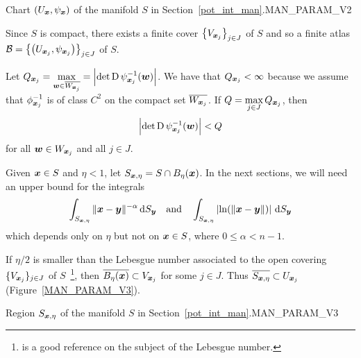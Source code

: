 {Chart $\displaystyle (U_{{\bm{x}}},\psi_{{\bm{x}}})$ of the manifold $S$ in
Section~\ref{pot_int_man}.}{MAN_PARAM_V2}

Since $S$ is compact, there exists a finite cover
$\displaystyle \left\{ V_{{\bm{x}}_j} \right\}_{j\in J}$ of $S$
and so a finite atlas
$\displaystyle \mathcal{B}
= \left\{ \left(U_{{\bm{x}}_j}, \psi_{{\bm{x}}_j}\right) \right\}_{j\in J}$
of $S$.

Let $\displaystyle Q_{{\bm{x}}_j} = \max_{{\bm{w}} \in \overline{W_{{\bm{x}}_j}}}
= \left|\det \operatorname{D} \psi_{{\bm{x}}_j}^{-1}({\bm{w}})\right|$.  We have that
$\displaystyle Q_{{\bm{x}}_j} < \infty$ because we assume that
$\displaystyle \phi_{{\bm{x}}_j}^{-1}$ is of class $\displaystyle C^2$
on the compact set $\displaystyle \overline{W_{{\bm{x}}_j}}$.
If $\displaystyle Q = \max_{j \in J} Q_{{\bm{x}}_j}$, then
\begin{equation} \label{defnQdetpsim1}
\left|\det \operatorname{D} \psi_{{\bm{x}}_j}^{-1}({\bm{w}})\right| < Q
\end{equation}
for all $\displaystyle {\bm{w}} \in W_{{\bm{x}}_j}$ and all $j \in J$.

Given ${\bm{x}} \in S$ and $\eta < 1$,
let $\displaystyle S_{{\bm{x}},\eta} = S \cap B_{\eta}({\bm{x}})$.
In the next sections, we will need an upper bound for the integrals
\[
\int_{S_{{\bm{x}},\eta}} \|{\bm{x}}-{\bm{y}}\|^{-\alpha} \,\mathrm{d}{S}_{{\bm{y}}} 
\quad \text{and} \quad
\int_{S_{{\bm{x}},\eta}} \left| \ln(\|{\bm{x}}-{\bm{y}}\|) \right| \,\mathrm{d}{S}_{{\bm{y}}} 
\]
which depends only on $\eta$ but not on ${\bm{x}} \in S$, where
$0 \leq \alpha < n - 1$.

If $\eta/2$ is smaller than the Lebesgue number associated to the
open covering $\displaystyle \{ V_{{\bm{x}}_j}\}_{j\in J}$ of
$S$~\footnote{\cite{Mu} is a good reference on the subject of the Lebesgue
number.}, then
$\displaystyle \overline{B_\eta({\bm{x}})} \subset V_{{\bm{x}}_j}$
for some $j \in J$.  Thus
$\displaystyle \overline{S_{{\bm{x}},\eta}} \subset U_{{\bm{x}}_j}$
(Figure~\ref{MAN_PARAM_V3}).

{Region $\displaystyle S_{{\bm{x}},\eta}$ of the manifold $S$ in
Section~\ref{pot_int_man}.}{MAN_PARAM_V3}

